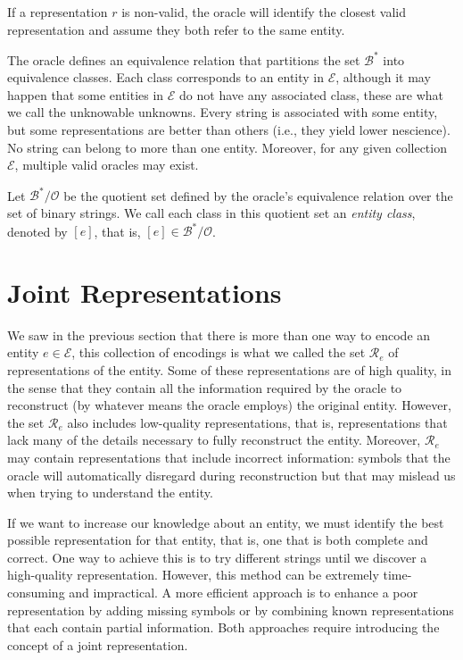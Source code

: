 If a representation $r$ is non-valid, the oracle will identify the closest valid representation and assume they both refer to the same entity.

The oracle defines an equivalence relation that partitions the set $\mathcal{B}^\ast$ into equivalence classes. Each class corresponds to an entity in $\mathcal{E}$, although it may happen that some entities in $\mathcal{E}$ do not have any associated class, these are what we call the unknowable unknowns. Every string is associated with some entity, but some representations are better than others (i.e., they yield lower nescience). No string can belong to more than one entity. Moreover, for any given collection $\mathcal{E}$, multiple valid oracles may exist.

\begin{definition}
Let $\mathcal{B}^\ast / \mathcal{O}$ be the quotient set defined by the oracle's equivalence relation over the set of binary strings. We call each class in this quotient set an \emph{entity class}, denoted by $[e]$, that is, $[e] \in \mathcal{B}^\ast / \mathcal{O}$.
\end{definition}

%
%

\section{Joint Representations}
\label{sec:descriptions_joint_topic}

We saw in the previous section that there is more than one way to encode an entity $e \in \mathcal{E}$, this collection of encodings is what we called the set $\mathcal{R}_e$ of representations of the entity. Some of these representations are of high quality, in the sense that they contain all the information required by the oracle to reconstruct (by whatever means the oracle employs) the original entity. However, the set $\mathcal{R}_e$ also includes low-quality representations, that is, representations that lack many of the details necessary to fully reconstruct the entity. Moreover, $\mathcal{R}_e$ may contain representations that include incorrect information: symbols that the oracle will automatically disregard during reconstruction but that may mislead us when trying to understand the entity.

If we want to increase our knowledge about an entity, we must identify the best possible representation for that entity, that is, one that is both complete and correct. One way to achieve this is to try different strings until we discover a high-quality representation. However, this method can be extremely time-consuming and impractical. A more efficient approach is to enhance a poor representation by adding missing symbols or by combining known representations that each contain partial information. Both approaches require introducing the concept of a joint representation.

